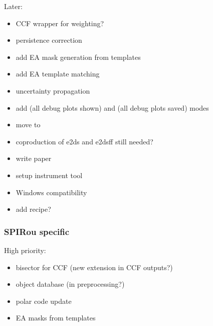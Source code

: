 \documentclass[a4paper,10pt,english]{report}
\begin{document}
Later:
\begin{itemize}
\item {} 
CCF wrapper for weighting?

\item {} 
persistence correction

\item {} 
add EA mask generation from templates

\item {} 
add EA template matching

\item {} 
uncertainty propagation

\item {} 
add  (all debug plots shown) and  (all debug plots saved) modes

\item {} 
move  to 

\item {} 
co\sphinxhyphen{}production of e2ds and e2dsff still needed?

\item {} 
write  paper

\item {} 
setup instrument tool

\item {} 
Windows compatibility

\item {} 
add  recipe?

\end{itemize}


\subsubsection{SPIRou specific}
\label{\detokenize{user/general/todo:spirou-specific}}
High priority:
\begin{itemize}
\item {} 
bisector for CCF (new extension in CCF outputs?)

\item {} 
object database (in preprocessing?)

\item {} 
polar code update

\item {} 
EA masks from templates

\end{itemize}
\end{document}

